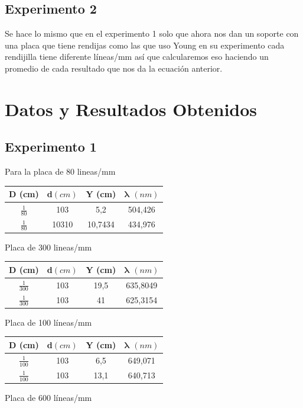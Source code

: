 \documentclass[13,twocolumn,letterpaper]{article}
\begin{document}
\subsection*{Experimento 2}

Se hace lo mismo que en el experimento 1 solo que ahora nos dan un soporte con una placa que tiene rendijas como las que uso Young en su experimento cada rendijilla tiene diferente líneas/mm así que calcularemos eso haciendo un promedio de cada resultado que nos da la ecuación anterior.\\


\section*{Datos y Resultados Obtenidos}
\subsection*{Experimento 1}
Para la placa de 80 lineas/mm

\begin{table}[h]
    \centering
    \begin{tabular}{|| c | c | c | c ||}
\hline 
D (cm) & \textbf{d}$(cm)$ & Y (cm) & $\mathbf{\lambda}$ $(n m)$ \\ \hline
$\frac{1}{80}$ & 103 & 5,2 & 504,426 \\ \hline
$\frac{1}{80}$ & 10310 & 10,7434 & 434,976 \\ \hline
    \end{tabular}
    \label{tab:my_label}
\end{table}

Placa de 300 lineas/mm

\begin{table}[h]
    \centering
    \begin{tabular}{|| c | c | c | c ||}
\hline 
D (cm) & \textbf{d}$(cm)$ & Y (cm) & $\mathbf{\lambda}$ $(n m)$ \\ \hline
$\frac{1}{300}$ & 103 & 19,5 & 635,8049 \\ \hline
$\frac{1}{300}$ & 103 & 41 & 625,3154 \\ \hline
    \end{tabular}
    \label{tab:my_label}
\end{table}

Placa de 100 líneas/mm
    
\begin{table}[h]
    \centering
    \begin{tabular}{|| c | c | c | c ||}
\hline 
D (cm) & \textbf{d}$(cm)$ & Y (cm) & $\mathbf{\lambda}$ $(n m)$ \\ \hline
$\frac{1}{100}$ & 103 & 6,5 & 649,071 \\ \hline
$\frac{1}{100}$ & 103& 13,1 & 640,713 \\ \hline
    \end{tabular}
    \label{tab:my_label}
\end{table}
Placa de 600 líneas/mm
\end{document}
